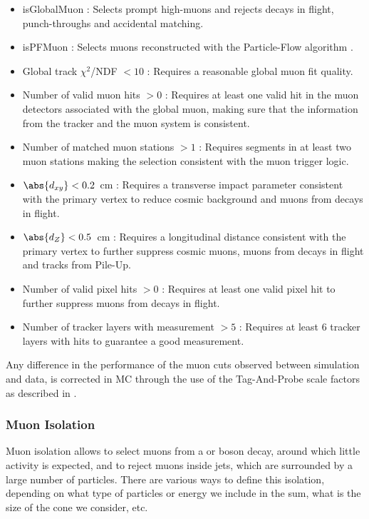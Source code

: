 \begin{itemize}
\item isGlobalMuon : Selects prompt high-\pt muons and rejects decays in flight, punch-throughs and accidental matching.
\item isPFMuon : Selects muons reconstructed with the Particle-Flow algorithm \cite{PF_Reco}.
\item Global track $\chi^{2}$/NDF $< 10$ : Requires a reasonable global muon fit quality.
\item Number of valid muon hits $> 0$ : Requires at least one valid hit in the muon detectors associated with the global muon, making sure that the information from the tracker and the muon system is consistent.
\item Number of matched muon stations $> 1$ : Requires segments in at least two muon stations making the selection consistent with the muon trigger logic.
\item $\abs{d_{xy}} < 0.2$~cm : Requires a transverse impact parameter consistent with the primary vertex to reduce cosmic background and muons from decays in flight.
\item $\abs{d_{Z}} < 0.5$~cm : Requires a longitudinal distance consistent with the primary vertex to further suppress cosmic muons, muons from decays in flight and tracks from Pile-Up.
\item Number of valid pixel hits $> 0$ : Requires at least one valid pixel hit to further suppress muons from decays in flight.
\item Number of tracker layers with measurement $> 5$ : Requires at least 6 tracker layers with hits to guarantee a good \pt measurement.
\end{itemize}

Any difference in the performance of the muon cuts observed between simulation and data, is corrected in MC through the use of the Tag-And-Probe scale factors as described in .


\subsubsection{Muon Isolation} \label{sec:WBoson_Analysis_MuonIsolation}

Muon isolation allows to select muons from a \W or \Z boson decay, around which little activity is expected, and to reject muons inside jets, which are surrounded by a large number of particles. There are various ways to define this isolation, depending on what type of particles or energy we include in the sum, what is the size of the cone we consider, etc.

